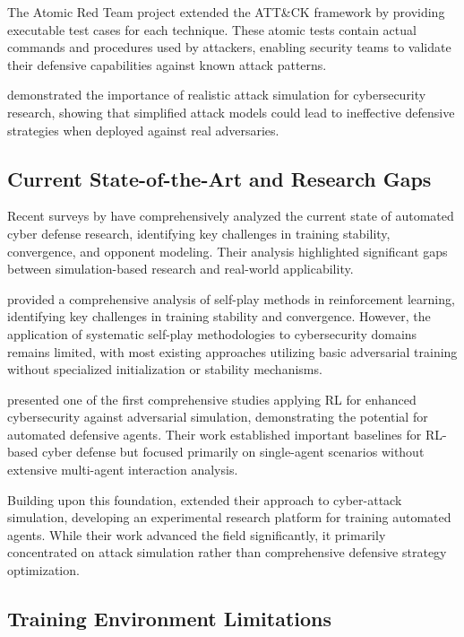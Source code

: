 The Atomic Red Team project \citep{redcanary2022atomic} extended the ATT\&CK framework by providing executable test cases for each technique. These atomic tests contain actual commands and procedures used by attackers, enabling security teams to validate their defensive capabilities against known attack patterns.

\citet{applebaum2016intelligent} demonstrated the importance of realistic attack simulation for cybersecurity research, showing that simplified attack models could lead to ineffective defensive strategies when deployed against real adversaries.

\subsection{Current State-of-the-Art and Research Gaps}

Recent surveys by \citet{vyas2023automated} have comprehensively analyzed the current state of automated cyber defense research, identifying key challenges in training stability, convergence, and opponent modeling. Their analysis highlighted significant gaps between simulation-based research and real-world applicability.

\citet{zhang2024survey} provided a comprehensive analysis of self-play methods in reinforcement learning, identifying key challenges in training stability and convergence. However, the application of systematic self-play methodologies to cybersecurity domains remains limited, with most existing approaches utilizing basic adversarial training without specialized initialization or stability mechanisms.

\citet{oh2023applying} presented one of the first comprehensive studies applying RL for enhanced cybersecurity against adversarial simulation, demonstrating the potential for automated defensive agents. Their work established important baselines for RL-based cyber defense but focused primarily on single-agent scenarios without extensive multi-agent interaction analysis.

Building upon this foundation, \citet{oh2024employing} extended their approach to cyber-attack simulation, developing an experimental research platform for training automated agents. While their work advanced the field significantly, it primarily concentrated on attack simulation rather than comprehensive defensive strategy optimization.

\subsection{Training Environment Limitations}

